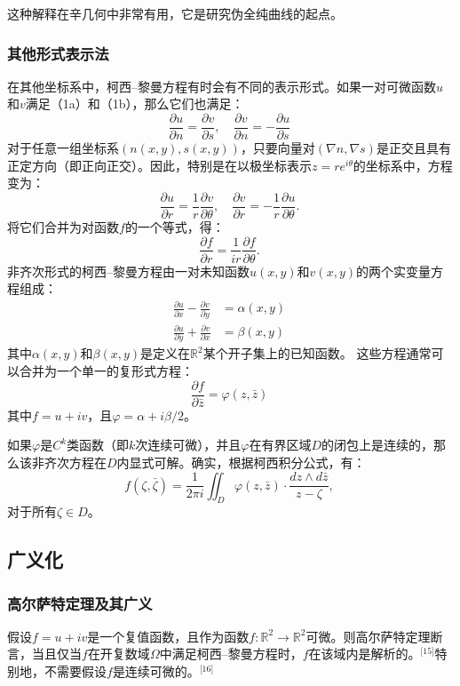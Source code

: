 这种解释在辛几何中非常有用，它是研究伪全纯曲线的起点。
\subsubsection{其他形式表示法}  
在其他坐标系中，柯西–黎曼方程有时会有不同的表示形式。如果一对可微函数\( u \)和\( v \)满足（1a）和（1b），那么它们也满足：
\[
\frac{\partial u}{\partial n} = \frac{\partial v}{\partial s}, \quad \frac{\partial v}{\partial n} = -\frac{\partial u}{\partial s}~
\]
对于任意一组坐标系\( (n(x, y), s(x, y)) \)，只要向量对\( (\nabla n, \nabla s) \)是正交且具有正定方向（即正向正交）。因此，特别是在以极坐标表示\( z = re^{i\theta} \)的坐标系中，方程变为：
\[
\frac{\partial u}{\partial r} = \frac{1}{r} \frac{\partial v}{\partial \theta}, \quad \frac{\partial v}{\partial r} = -\frac{1}{r} \frac{\partial u}{\partial \theta}.~
\]
将它们合并为对函数\( f \)的一个等式，得：
\[
\frac{\partial f}{\partial r} = \frac{1}{ir} \frac{\partial f}{\partial \theta}.~
\]
非齐次形式的柯西–黎曼方程由一对未知函数\( u(x, y) \)和\( v(x, y) \)的两个实变量方程组成：
\[
\begin{aligned}
\frac{\partial u}{\partial x} - \frac{\partial v}{\partial y} &= \alpha(x, y) \\
\frac{\partial u}{\partial y} + \frac{\partial v}{\partial x} &= \beta(x, y)
\end{aligned}~
\]
其中\( \alpha(x, y) \)和\( \beta(x, y) \)是定义在\( \mathbb{R}^2 \)某个开子集上的已知函数。  
这些方程通常可以合并为一个单一的复形式方程：
\[
\frac{\partial f}{\partial \bar{z}} = \varphi(z, \bar{z})~
\]
其中\( f = u + iv \)，且\( \varphi = \alpha + i\beta/2\)。

如果\( \varphi \)是\( C^k \)类函数（即\( k \)次连续可微），并且\( \varphi \)在有界区域\( D \)的闭包上是连续的，那么该非齐次方程在\( D \)内显式可解。确实，根据柯西积分公式，有：
\[
f(\zeta, \bar{\zeta}) = \frac{1}{2\pi i} \iint_D \varphi(z, \bar{z}) \cdot \frac{dz \wedge d\bar{z}}{z - \zeta},~
\]
对于所有\(\zeta \in D\)。
\subsection{广义化}  
\subsubsection{高尔萨特定理及其广义}  
假设\( f = u + iv \)是一个复值函数，且作为函数\( f: \mathbb{R}^2 \to \mathbb{R}^2 \)可微。则高尔萨特定理断言，当且仅当\( f \)在开复数域\( \Omega \)中满足柯西–黎曼方程时，\( f \)在该域内是解析的。\(^\text{[15]}\)特别地，不需要假设\( f \)是连续可微的。\(^\text{[16]}\)

